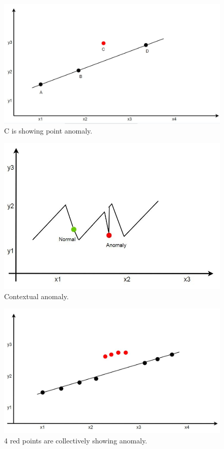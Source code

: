 \documentclass[14pt, conference]{IEEEtran}
\begin{document}
\begin{figure}[tb]
  \includegraphics[width=\linewidth]{point.JPG}
  \caption{C is showing point anomaly.}
  \label{fig:point}
\end{figure}

\begin{figure}[bth]
  \includegraphics[width=\linewidth]{contextual.JPG}
  \caption{Contextual anomaly.}
  \label{fig:point}
\end{figure}

\begin{figure}[h]
  \includegraphics[width=\linewidth]{collective.JPG}
  \caption{4 red points are collectively showing anomaly.}
  \label{fig:point}
\end{figure}
\end{document}
